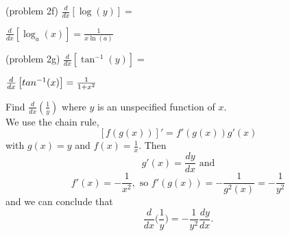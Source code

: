 \documentclass[handout]{ximera}
\begin{document}
\begin{problem}(problem 2f)
$\displaystyle{\frac{d}{dx} \left[\log(y)\right]=}$
 
\begin{multipleChoice}
\end{multipleChoice}
	  
    
    \begin{hint}
      $\frac{d}{dx}\left[\log_a(x)\right] = \frac{1}{x\ln(a)}$
    \end{hint}
    
\end{problem}

\begin{problem}(problem 2g)
$\displaystyle{\frac{d}{dx} \left[\tan^{-1}(y)\right]=}$
 
\begin{multipleChoice}
\end{multipleChoice}
	   
    \begin{hint}
      $\frac{d}{dx}\left[\\tan^{-1}(x)\right] = \frac{1}{1+x^2}$
    \end{hint}
    
\end{problem}


\begin{example}[example 3]
Find $\frac{d}{dx} \left(\frac{1}{y}\right)$ where $y$ is an unspecified function of $x$.\\
We use the chain rule,
\[\displaystyle{[f(g(x))]' = f'(g(x))g'(x)}\]
with $g(x) = y$ and $f(x) = \frac{1}{x}$. Then 
\[g'(x) = \frac{dy}{dx} \text{ and}\]
\[f'(x) = -\frac{1}{x^2}, \text{ so } f'(g(x)) = -\frac{1}{g^2(x)} = -\frac{1}{y^2}\]
and we can conclude that
\[\frac{d}{dx} \Big(\frac{1}{y}\Big) = -\frac{1}{y^2} \frac{dy}{dx}.\]
\end{example}


\begin{center}
\begin{foldable}
\end{foldable}
\end{center}
\end{document}
